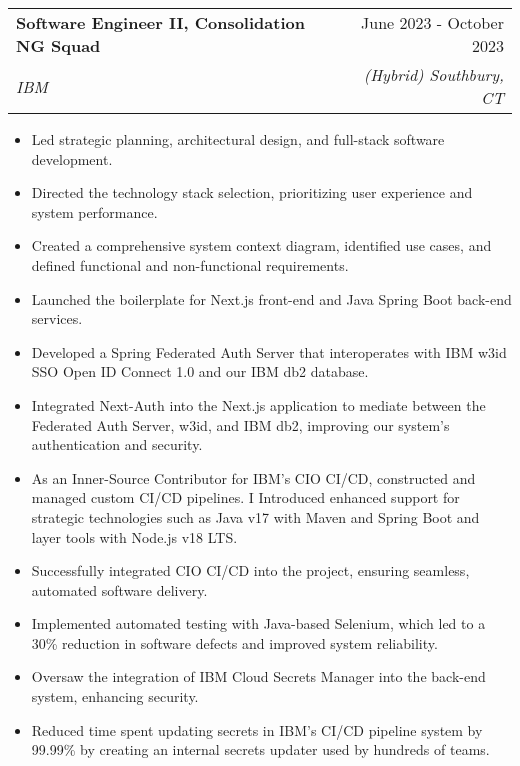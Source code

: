 \documentclass[letterpaper,11pt]{article}
\makeatletter
\newcommand{\resumeItem}[1]{
  \item[-] \small{
    {#1 \vspace{-2pt}}
  }
}
\newcommand{\resumeSubheading}[4]{
  \vspace{-2pt}\item
    \begin{tabular*}{0.97\textwidth}[t]{l@{\extracolsep{\fill}}r}
      \textbf{#1} & #2 \\
      \textit{\small#3} & \textit{\small #4} \\
    \end{tabular*}\vspace{-7pt}
}
\newcommand{\resumeItemListStart}{\begin{itemize}[rightmargin=\dimexpr\linewidth-17.25cm-\leftmargin\relax]}
\newcommand{\resumeItemListEnd}{\end{itemize}\vspace{-5pt}}
\makeatother
\begin{document}
\resumeSubheading
{Software Engineer II, Consolidation NG Squad}{June 2023 - October 2023}
{IBM}{(Hybrid) Southbury, CT}
\resumeItemListStart
\resumeItem{Led strategic planning, architectural design, and full-stack software development.}
\resumeItem{Directed the technology stack selection, prioritizing user experience and system performance.}
\resumeItem{Created a comprehensive system context diagram, identified use cases, and defined functional and non-functional requirements.}
\resumeItem{Launched the boilerplate for Next.js front-end and Java Spring Boot back-end services.}
\resumeItem{Developed a Spring Federated Auth Server that interoperates with IBM w3id SSO Open ID Connect 1.0 and our IBM db2 database.}
\resumeItem{Integrated Next-Auth into the Next.js application to mediate between the Federated Auth Server, w3id, and IBM db2, improving our system's authentication and security.}
\resumeItem{As an Inner-Source Contributor for IBM's CIO CI/CD, constructed and managed custom CI/CD pipelines. I Introduced enhanced support for strategic technologies such as Java v17 with Maven and Spring Boot and layer tools with Node.js v18 LTS.}
\resumeItem{Successfully integrated CIO CI/CD into the project, ensuring seamless, automated software delivery.}
\resumeItem{Implemented automated testing with Java-based Selenium, which led to a 30\% reduction in software defects and improved system reliability.}
\resumeItem{Oversaw the integration of IBM Cloud Secrets Manager into the back-end system, enhancing security.}
\resumeItem{Reduced time spent updating secrets in IBM's CI/CD pipeline system by 99.99\% by creating an internal secrets updater used by hundreds of teams.}
\resumeItemListEnd
\end{document}
